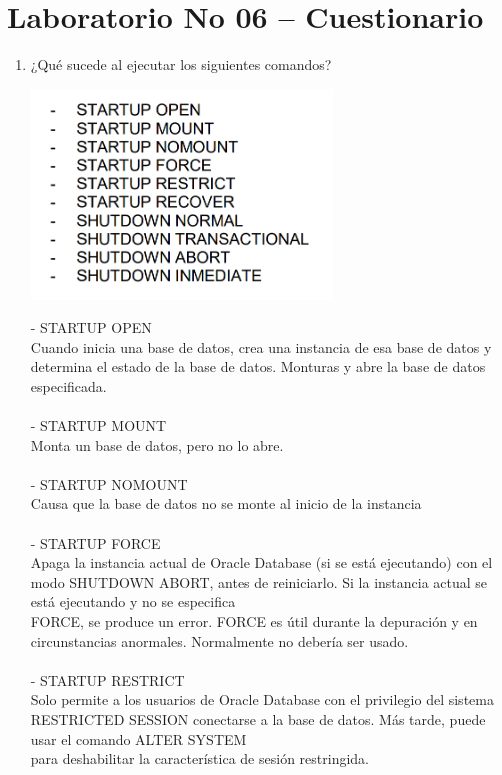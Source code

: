 \section{Laboratorio No 06 – Cuestionario} 

\begin{enumerate}[1.]
	\item ¿Qué sucede al ejecutar los siguientes comandos?
	\begin{center}
	\includegraphics[width=8cm]{./Imagenes/actividad_5_1_lab_06}
	\end{center}	
	- STARTUP OPEN 
	\\Cuando inicia una base de datos, crea una instancia de esa base de datos y determina el estado de la base de datos. Monturas y abre la base de datos especificada.
	\\
	\\- STARTUP MOUNT 
	\\Monta un base de datos, pero no lo abre.
	\\
	\\- STARTUP NOMOUNT 
	\\Causa que la base de datos no se monte al inicio de la instancia 
	\\
	\\- STARTUP FORCE 
	\\Apaga la instancia actual de Oracle Database (si se est\'a ejecutando) con el modo SHUTDOWN ABORT, antes de reiniciarlo. Si la instancia actual se est\'a ejecutando y no se especifica 
	\\FORCE, se produce un error. FORCE es útil durante la depuración y en circunstancias anormales. Normalmente no debería ser usado.
	\\
	\\- STARTUP RESTRICT 
	\\Solo permite a los usuarios de Oracle Database con el privilegio del sistema RESTRICTED SESSION conectarse a la base de datos. M\'as tarde, puede usar el comando ALTER SYSTEM 
	\\para deshabilitar la caracter\'istica de sesi\'on restringida.

\end{enumerate}
